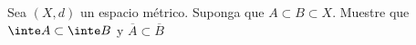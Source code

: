 \documentclass[a4paper,oneside,10.5pt]{USMArt}
\begin{document}
\begin{comment}
\begin{sol}
  Supongamos que $\theta \subset X$ es abierto. Veamos que $X \setminus \theta$ es cerrado. Sea $x \in \overline{X \setminus \theta}$ y $\epsilon > 0$, luego $B(x, \epsilon) \cap (X \setminus \theta) \neq \emptyset$, por lo tanto $x \notin \theta$, pues si estuviera en $\theta$ existiría $\epsilon_{0} > 0$ tal que $B(x, \epsilon_{0}) \cap X \setminus \theta \neq \emptyset$ y $B(x, \epsilon_{0}) \subset \theta$. Es decir $\overline{X \setminus \theta} \subset X \setminus \theta$. La otra inclusión viene de una proposición de clases y por lo tanto es cerrado.
  \newline

  Supongamos que $X \setminus \theta \subset X$ es cerrado, veamos que $\theta$ es abierto. Sea $x \in \theta$, si suponemos que para todo $\varepsilon > 0$, $B(x, \varepsilon)$ no esta contenido en $\theta$, esto significa que $B(x, \varepsilon) \cap \theta \neq \emptyset$, dado que se cumpliría para todo $\varepsilon$, esto implica que $x \in \overline{X \setminus \theta} = X \setminus \theta$, contradicción.
  Por lo tanto $\theta$ es abierto.
\end{sol}
\end{comment}

\begin{prob}
  Sea $(X, d)$ un espacio métrico. Suponga que $A \subset B \subset X$. Muestre que
  $\inte A \subset \inte B$ y $\overline{A} \subset \overline{B}$
\end{prob}
\begin{comment}
\begin{sol}
  Mostremos que $\inte A \subset \inte B$. Sea $x \in \inte A$, luego existe $\varepsilon > 0$ de tal forma que $B(x, \varepsilon) \subset A \subset B$. Por lo tanto $x \in \inte B$, es decir $\inte A \subset \inte B$.
  \newline

  Mostremos que $\overline{A} \subset \overline{B}$. Sea $x \in \overline{A}$, luego para todo $\varepsilon > 0$, $B(x, \varepsilon) \cap A \neq \emptyset$, dado que $A \subset B \implies B(x, \varepsilon) \cap A \subset B(x, \varepsilon) \cap B$ y por lo tanto
  \begin{equation*}
    B(x, \varepsilon) \cap B \neq \emptyset
  \end{equation*}

  Es decir $x \in \overline{B}$. Por lo tanto $\overline{A} \subset \overline{B}$
\end{sol}
\end{comment}
\end{document}
